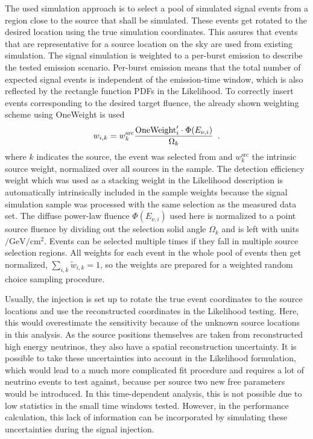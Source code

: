 The used simulation approach is to select a pool of simulated signal events from a region close to the source that shall be simulated.
These events get rotated to the desired location using the true simulation coordinates.
This assures that events that are representative for a source location on the sky are used from existing simulation.
The signal simulation is weighted to a per-burst emission to describe the tested emission scenario.
Per-burst emission means that the total number of expected signal events is independent of the emission-time window, which is also reflected by the rectangle function PDFs in the Likelihood.
To correctly insert events corresponding to the desired target fluence, the already shown weighting scheme using OneWeight is used
\begin{equation}
  \label{equ:sig_inj_weights}
  w_{i,k} = w_k^\text{src} \frac{\text{OneWeight}'_i \cdot
    \Phi(E_{\nu,i})}{\Omega_k}
  \enspace\text{.}
\end{equation}
where $k$ indicates the source, the event was selected from and $w_k^\text{src}$ the intrinsic source weight, normalized over all sources in the sample.
The detection efficiency weight which was used as a stacking weight in the Likelihood description is automatically intrinsically included in the sample weights because the signal simulation sample was processed with the same selection as the measured data set.
The diffuse power-law fluence $\Phi(E_{\nu,i})$ used here is normalized to a point source fluence by dividing out the selection solid angle $\Omega_k$ and is left with units $\si{\per\GeV\per\cm\squared}$.
Events can be selected multiple times if they fall in multiple source selection regions.
All weights for each event in the whole pool of events then get normalized, $\sum_{i,k}\tilde{w}_{i,k} = 1$, so the weights are prepared for a weighted random choice sampling procedure.

Usually, the injection is set up to rotate the true event coordinates to the source locations and use the reconstructed coordinates in the Likelihood testing.
Here, this would overestimate the sensitivity because of the unknown source locations in this analysis.
As the source positions themselves are taken from reconstructed high energy neutrinos, they also have a spatial reconstruction uncertainty.
It is possible to take these uncertainties into account in the Likelihood formulation, which would lead to a much more complicated fit procedure and requires a lot of neutrino events to test against, because per source two new free parameters would be introduced.
In this time-dependent analysis, this is not possible due to low statistics in the small time windows tested.
However, in the performance calculation, this lack of information can be incorporated by simulating these uncertainties during the signal injection.

